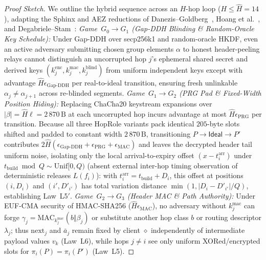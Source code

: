 \documentclass[journal]{IEEEtran}
\DeclareRobustCommand{\code}[1]{{\ttfamily\renewcommand{\_}{\textunderscore\allowbreak}#1}}
\begin{document}
\begin{proof}[Proof Sketch]
We outline the hybrid sequence across an $H$-hop loop ($H\le\hat{H}=14$), adapting the Sphinx and AEZ reductions of Danezis--Goldberg~\cite{Danezis2009}, Hoang et al.~\cite{Hoang2015}, and Degabriele--Stam~\cite{Degabriele2018}:
\emph{Game~$G_0\to G_1$ (Gap-DDH Blinding \& Random-Oracle Key Schedule):} Under Gap-DDH over secp256k1 and random-oracle HKDF, even an active adversary submitting chosen group elements $\alpha$ to honest header-peeling relays cannot distinguish an uncorrupted hop $j$'s ephemeral shared secret and derived keys $(k^{\mathrm{enc}}_j,k^{\mathrm{mac}}_j,k^{\mathrm{blind}}_j)$ from uniform independent keys except with advantage $\hat{H}\epsilon_{\mathrm{Gap\text{-}DDH}}$ per real-to-ideal transition, ensuring fresh unlinkable $\alpha_j\neq\alpha_{j+1}$ across re-blinded segments.
\emph{Game~$G_1\to G_2$ (PRG Pad \& Fixed-Width Position Hiding):} Replacing ChaCha20 keystream expansions over $|\beta|=\hat{H}\ell=2\,870\,\mathrm{B}$ at each uncorrupted hop incurs advantage at most $\hat{H}\epsilon_{\mathrm{PRG}}$ per transition. Because all three \code{HopRole} variants pack identical $205$-byte slots shifted and padded to constant width $2\,870\,\mathrm{B}$, transitioning $P\to\mathsf{Ideal}\to P'$ contributes $2\hat{H}(\epsilon_{\mathrm{Gap\text{-}DDH}}+\epsilon_{\mathrm{PRG}}+\epsilon_{\mathrm{MAC}})$ and leaves the decrypted header tail uniform noise, isolating only the local arrival-to-expiry offset $(x-t^{\mathrm{arr}}_i)$ under $t_{\mathrm{build}}\bmod Q\sim\mathrm{Unif}[0,Q)$ (absent external inter-hop timing observation of deterministic releases $L(f_i)$): with $t^{\mathrm{arr}}_i=t_{\mathrm{build}}+D_i$, this offset at positions $(i,D_i)$ and $(i',D'_{i'})$ has total variation distance $\min(1,|D_i-D'_{i'}|/Q)$, establishing Law~L5$'$.
\emph{Game~$G_2\to G_3$ (Header MAC \& Path Authority):} Under EUF-CMA security of HMAC-SHA256 ($\hat{H}\epsilon_{\mathrm{MAC}}$), no adversary without $k^{\mathrm{mac}}_j$ can forge $\gamma_j=\mathrm{MAC}_{k^{\mathrm{mac}}_j}(b\Vert\beta_j)$ or substitute another hop class $b$ or routing descriptor $\lambda_j$; thus $\mathrm{next}_j$ and $\bar{a}_j$ remain fixed by client $\diamond$ independently of intermediate payload values $v_k$ (Law~L6), while hops $j\neq i$ see only uniform XORed/encrypted slots for $\pi_i(P)=\pi_i(P')$ (Law~L5).

\end{proof}
\end{document}
